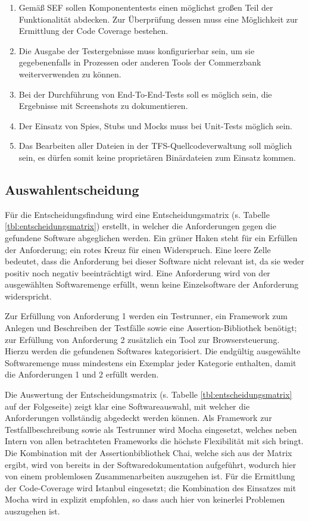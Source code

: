 \begin{enumerate}
	\item Gemäß SEF sollen Komponententests \glqq einen möglichst großen Teil der Funktionalität abdecken\grqq{}\cite{coba-sef}. Zur Überprüfung dessen muss eine Möglichkeit zur Ermittlung der Code Coverage bestehen.
	\item Die Ausgabe der Testergebnisse muss konfigurierbar sein, um sie gegebenenfalls in Prozessen oder anderen Tools der Commerzbank weiterverwenden zu können.
	\item Bei der Durchführung von End-To-End-Tests soll es möglich sein, die Ergebnisse mit Screenshots zu dokumentieren.
	\item Der Einsatz von Spies, Stubs und Mocks muss bei Unit-Tests möglich sein.
	\item Das Bearbeiten aller Dateien in der TFS-Quellcodeverwaltung soll möglich sein, es dürfen somit keine proprietären Binärdateien zum Einsatz kommen.
\end{enumerate}

\newpage


\newpage
\subsection{Auswahlentscheidung}
Für die Entscheidungsfindung wird eine Entscheidungsmatrix (s. Tabelle \ref{tbl:entscheidungsmatrix}) erstellt, in welcher die Anforderungen gegen die gefundene Software abgeglichen werden. Ein grüner Haken steht für ein Erfüllen der Anforderung; ein rotes Kreuz für einen Widerspruch. Eine leere Zelle bedeutet, dass die Anforderung bei dieser Software nicht relevant ist, da sie weder positiv noch negativ beeinträchtigt wird. Eine Anforderung wird von der ausgewählten Softwaremenge erfüllt, wenn keine Einzelsoftware der Anforderung widerspricht.

Zur Erfüllung von Anforderung 1 werden ein Testrunner, ein Framework zum Anlegen und Beschreiben der Testfälle sowie eine Assertion-Bibliothek benötigt; zur Erfüllung von Anforderung 2 zusätzlich ein Tool zur Browsersteuerung. Hierzu werden die gefundenen Softwares  kategorisiert. Die endgültig ausgewählte Softwaremenge muss mindestens ein Exemplar jeder Kategorie enthalten, damit die Anforderungen 1 und 2 erfüllt werden.

Die Auswertung der Entscheidungsmatrix (s. Tabelle \ref{tbl:entscheidungsmatrix} auf der Folgeseite) zeigt klar eine Softwareauswahl, mit welcher die Anforderungen vollständig abgedeckt werden können. Als Framework zur Testfallbeschreibung sowie als Testrunner wird Mocha eingesetzt, welches neben Intern von allen betrachteten Frameworks die höchste Flexibilität mit sich bringt. Die Kombination mit der Assertionbibliothek Chai, welche sich aus der Matrix ergibt, wird von \textcite{mocha-index} bereits in der Softwaredokumentation aufgeführt, wodurch hier von einem problemlosen Zusammenarbeiten auszugehen ist. Für die Ermittlung der Code-Coverage wird Istanbul eingesetzt; die Kombination des Einsatzes mit Mocha wird in \cite{istanbul} explizit empfohlen, so dass auch hier von keinerlei Problemen auszugehen ist.

